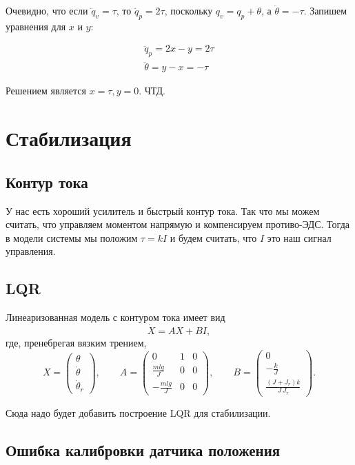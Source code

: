\documentclass{article}
\begin{document}
Очевидно, что если $\ddot q_v = \tau$, то $\ddot q_p = 2\tau$, поскольку $q_v = q_p + \theta$, а $\ddot\theta = -\tau$. Запишем уравнения для $x$ и $y$:

\begin{align*}
\ddot q_p = 2x - y = 2\tau\\
\ddot\theta = y - x = -\tau
\end{align*}

Решением является $x=\tau, y=0$. ЧТД.

\fi

\section{Стабилизация}

\subsection{Контур тока}
У нас есть хороший усилитель и быстрый контур тока. Так что мы можем считать, что управляем моментом напрямую и компенсируем противо-ЭДС. Тогда в модели системы мы положим $\tau=kI$ и будем считать, что $I$ это наш сигнал управления.  
\subsection{LQR}
Линеаризованная модель с контуром тока имеет вид
\[
	\dot{X} = A X + B I,
\]
где, пренебрегая вязким трением,
\[
X = \begin{pmatrix}\theta \\ \dot\theta \\ \dot\theta_r \end{pmatrix},
\qquad 
A= \begin{pmatrix} 0 & 1 & 0 \\ \frac{mlg}{J} & 0 & 0 \\ -\frac{mlg}{J} & 0 & 0 \end{pmatrix},
\qquad 
B=\begin{pmatrix}0\\ -\frac{k}{J} \\ \frac{(J+J_r)k}{J\,J_r} \end{pmatrix}.
\]

Сюда надо будет добавить построение LQR для стабилизации.

\subsection{Ошибка калибровки датчика положения}\label{sec:calib}
\end{document}
